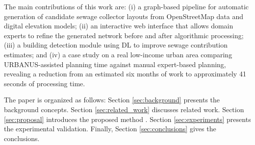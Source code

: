 The main contributions of this work are:
(i) a graph-based pipeline for automatic generation of candidate sewage collector layouts from OpenStreetMap data and digital elevation models;
(ii) an interactive web interface that allows domain experts to refine the generated network before and after algorithmic processing;
(iii) a building detection module using DL to improve sewage contribution estimates;
and (iv) a case study on a real low-income urban area comparing URBANUS-assisted planning time against manual expert-based planning, revealing a reduction from an estimated six months of work to approximately 41 seconds of processing time.

The paper is organized as follows:
Section \ref{sec:background} presents the background concepts.
Section \ref{sec:related_work} discusses related work.
Section \ref{sec:proposal} introduces the proposed method \method.
Section \ref{sec:experiments} presents the experimental validation.
Finally, Section \ref{sec:conclusions} gives the conclusions.

